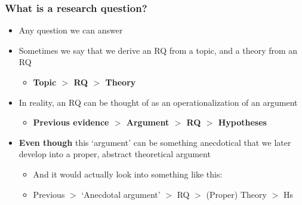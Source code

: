 \begin{frame}
\frametitle{What is a research question?}
\centering

\begin{itemize}
  \item<1-> Any question we can answer
  \item<1-> Sometimes we say that we derive an RQ from a topic, and a theory from an RQ
  \begin{itemize}
    \item \textbf{Topic $>$ RQ $>$ Theory}
  \end{itemize}
  \item<2-> In reality, an RQ can be thought of as an operationalization of an argument
  \begin{itemize}
    \item \textbf{Previous evidence $>$ Argument $>$ RQ $>$ Hypotheses}
  \end{itemize}
  \item<2-> \textbf{Even though} this `argument' can be something anecdotical that we later develop into a proper, abstract theoretical argument
  \begin{itemize}
    \item<3-> And it would actually look into something like this:
    \item<3-> Previous $>$ `Anecdotal argument' $>$ RQ $>$ (Proper) Theory $>$ Hs
  \end{itemize}
\end{itemize}

\end{frame}

